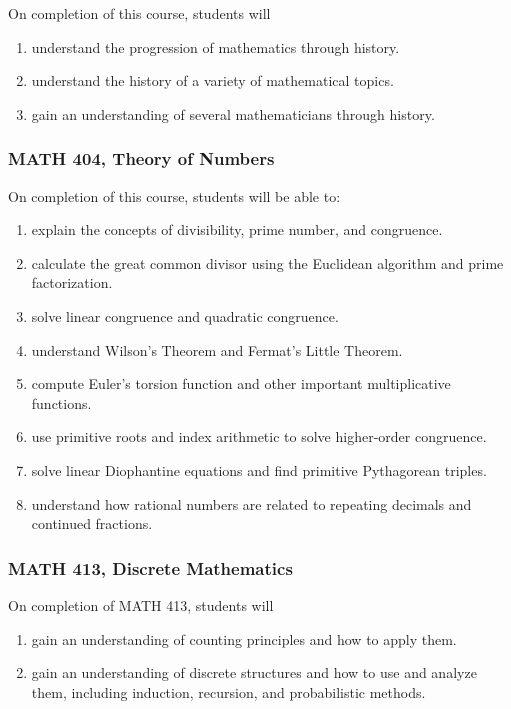 \documentclass[11pt]{article}
\newenvironment{alphalist}{
  \begin{enumerate}[(1)]
    \addtolength{\itemsep}{-1.0\itemsep}}
  {\end{enumerate}}
\begin{document}
On completion of this course, students will 
\begin{alphalist}
    \item understand the progression of mathematics through history.
    \item understand the history of a variety of mathematical topics.
    \item gain an understanding of several mathematicians through history.
\end{alphalist}

\subsubsection*{MATH 404, Theory of Numbers}

On completion of this course, students will be able to:
\begin{alphalist}
    \item explain the concepts of divisibility, prime number, and congruence. 
    \item calculate the great common divisor using the Euclidean algorithm and prime factorization.
    \item solve linear congruence and quadratic congruence.
    \item understand Wilson's Theorem and Fermat's Little Theorem. 
    \item compute Euler's torsion function and other important multiplicative functions.
    \item use primitive roots and index arithmetic to solve higher-order congruence.  
    \item solve linear Diophantine equations and find primitive Pythagorean triples.
    \item understand how rational numbers are related to repeating decimals and continued fractions.
\end{alphalist}

\subsubsection*{MATH 413, Discrete Mathematics}

On completion of MATH 413, students will 
\begin{alphalist}
    \item gain an understanding of counting principles and how to apply them.
    \item gain an understanding of discrete structures and how to use and analyze them, including induction, recursion, and probabilistic methods.
\end{alphalist}
\end{document}
